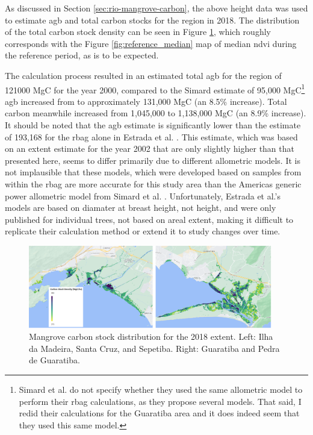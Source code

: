 As discussed in Section \ref{sec:rio-mangrove-carbon}, the above height data was used to estimate \ac{agb} and total carbon stocks for the region in 2018. The distribution of the total carbon stock density can be seen in Figure \ref{fig:carbon_density}, which roughly corresponds with the Figure \ref{fig:reference_median} map of median \ac{ndvi} during the reference period, as is to be expected. 

The calculation process resulted in an estimated total \ac{agb} for the region of 121000 MgC for the year 2000, compared to the Simard estimate of 95,000 MgC\footnote{Simard et al. do not specify whether they used the same allometric model to perform their \ac{rbag} calculations, as they propose several models. That said, I redid their calculations for the Guaratiba area and it does indeed seem that they used this same model.} \ac{agb} increased from to approximately 131,000 MgC (an 8.5\% increase). Total carbon meanwhile increased from 1,045,000 to 1,138,000 MgC (an 8.9\% increase). It should be noted that the \ac{agb} estimate is significantly lower than the estimate of 193,168 for the \ac{rbag} alone in Estrada et al. \cite{estradaEconomicEvaluationCarbon2015}. This estimate, which was based on an extent estimate for the year 2002 that are only slightly higher than that presented here, seems to differ primarily due to different allometric models. It is not implausible that these models, which were developed based on samples from within the \ac{rbag} are more accurate for this study area than the Americas generic power allometric model from Simard et al. \cite{simardMangroveCanopyHeight2019}. Unfortunately, Estrada et al.'s models are based on diamater at breast height, not height, and were only published for individual trees, not based on areal extent, making it difficult to replicate their calculation method or extend it to study changes over time. 

\begin{figure}[!htb] 
\centering
\includegraphics[width=0.95\textwidth]{Figures/chap4/carbon_density.png}
\caption[Mangrove Carbon Stock Distribution]{Mangrove carbon stock distribution for the 2018 extent. Left: Ilha da Madeira, Santa Cruz, and Sepetiba. Right: Guaratiba and Pedra de Guaratiba.}
\label{fig:carbon_density}
\end{figure}

